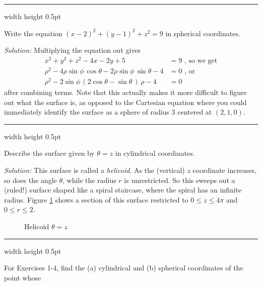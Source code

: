 \vspace{2mm}
\hrule width \textwidth height 0.5pt
\begin{exmp}
 Write the equation $(x - 2)^2 + (y - 1)^2 + z^2 = 9$ in spherical coordinates.\vspace{1mm}
 \par\noindent \emph{Solution:} Multiplying the equation out gives
 \begin{align*}
  x^2 + y^2 + z^2 - 4x - 2y + 5 &= 9 \text{~, so we get}\\
  \rho^2 - 4 \rho \sin \phi \,\cos \theta - 2 \rho \sin \phi \,\sin \theta - 4 &= 0 \text{~,~or}\\
  \rho^2 - 2 \sin \phi \, ( 2 \cos \theta - \sin \theta \, ) \,\rho - 4 &= 0
 \end{align*}
 after combining terms. Note that this actually makes it more difficult to figure out what the surface is,
 as opposed to the Cartesian equation where you could immediately identify the surface as a sphere of radius $3$ centered
 at $(2,1,0)$.
\end{exmp}
\hrule width \textwidth height 0.5pt
\begin{exmp}\label{exmp:helicoid}
 Describe the surface given by $\theta = z$ in cylindrical coordinates.\vspace{1mm}
 \par\noindent \emph{Solution:} This surface is called a \emph{helicoid}. As the (vertical) $z$
 coordinate increases, so does the angle $\theta$, while the radius $r$ is unrestricted. So this sweeps out a (ruled!)
 surface shaped like a spiral staircase, where the spiral has an infinite radius. Figure \ref{fig:helicoid} shows a
 section of this surface restricted to $0 \le z \le 4\pi$ and $0 \le r \le 2$.\vspace{-20mm}
 \begin{figure}[h]
  \begin{center}
   
  \end{center}\vspace{-12mm}
 \caption[]{\quad Helicoid $\theta = z$}
 \label{fig:helicoid}
 \end{figure}
\end{exmp}\vspace{-4mm}
\hrule width \textwidth height 0.5pt
\newpage
\centerline{}\label{sec1dot7}
\par\noindent For Exercises 1-4, find the (a) cylindrical and (b) spherical coordinates of the point whose
